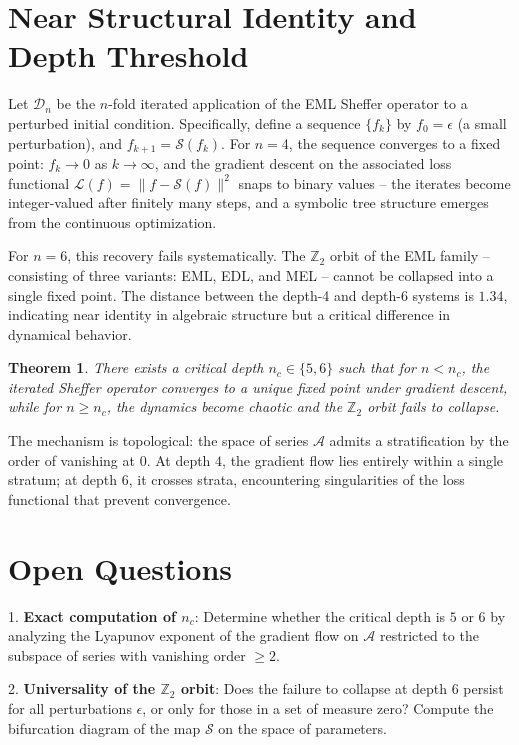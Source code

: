 \documentclass{article}
\newtheorem{theorem}{Theorem}
\begin{document}
\section{Near Structural Identity and Depth Threshold}

Let $\mathcal{D}_n$ be the $n$-fold iterated application of the EML Sheffer operator to a perturbed initial condition. Specifically, define a sequence $\{f_k\}$ by $f_0 = \epsilon$ (a small perturbation), and $f_{k+1} = \mathcal{S}(f_k)$. For $n = 4$, the sequence converges to a fixed point: $f_k \to 0$ as $k \to \infty$, and the gradient descent on the associated loss functional $\mathcal{L}(f) = \|f - \mathcal{S}(f)\|^2$ snaps to binary values -- the iterates become integer-valued after finitely many steps, and a symbolic tree structure emerges from the continuous optimization.

For $n = 6$, this recovery fails systematically. The $\mathbb{Z}_2$ orbit of the EML family -- consisting of three variants: EML, EDL, and MEL -- cannot be collapsed into a single fixed point. The distance between the depth-4 and depth-6 systems is $1.34$, indicating near identity in algebraic structure but a critical difference in dynamical behavior.

\begin{theorem}
There exists a critical depth $n_c \in \{5,6\}$ such that for $n < n_c$, the iterated Sheffer operator converges to a unique fixed point under gradient descent, while for $n \geq n_c$, the dynamics become chaotic and the $\mathbb{Z}_2$ orbit fails to collapse.
\end{theorem}

The mechanism is topological: the space of series $\mathcal{A}$ admits a stratification by the order of vanishing at $0$. At depth $4$, the gradient flow lies entirely within a single stratum; at depth $6$, it crosses strata, encountering singularities of the loss functional that prevent convergence.

\section{Open Questions}

1. \textbf{Exact computation of $n_c$}: Determine whether the critical depth is $5$ or $6$ by analyzing the Lyapunov exponent of the gradient flow on $\mathcal{A}$ restricted to the subspace of series with vanishing order $\geq 2$.

2. \textbf{Universality of the $\mathbb{Z}_2$ orbit}: Does the failure to collapse at depth $6$ persist for all perturbations $\epsilon$, or only for those in a set of measure zero? Compute the bifurcation diagram of the map $\mathcal{S}$ on the space of parameters.
\end{document}
